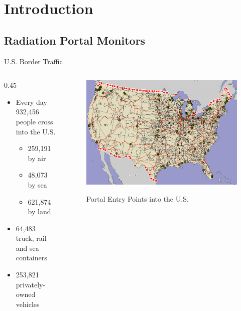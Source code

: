 

\section{Introduction}

\subsection{Radiation Portal Monitors}

\begin{frame}{U.S. Border Traffic}
\begin{columns}[onlytextwidth]
\begin{column} {0.45\textwidth}
 
  \begin{itemize}
  \item Every day 932,456 people cross into the U.S. \cite{cpb_typical_2012}
    \begin{itemize}
    	\item 259,191 by air
	\item 48,073 by sea
	\item 621,874 by land
    \end{itemize}
  \item 64,483 truck, rail and sea containers \cite{cpb_typical_2012}
 \item 253,821 privately-owned vehicles \cite{cpb_typical_2012}
  \end{itemize}
\end{column}
\begin{column}{0.45\textwidth}
\centering
\begin{figure}
		\includegraphics[width=\textwidth]{images/PortalEntryMap.eps}
		\label{fig:PortalEntryMap}
	\caption{Portal Entry Points into the U.S.}
\end{figure}
\end{column}
\end{columns}
\end{frame}

